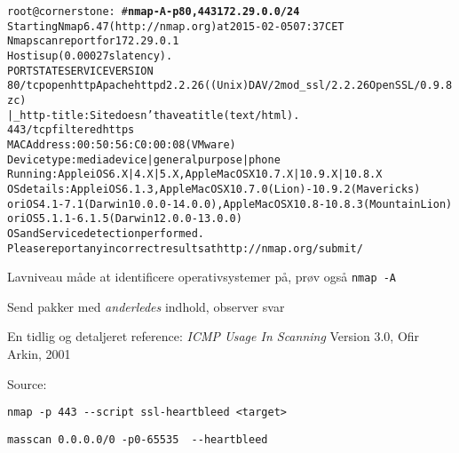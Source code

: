 \documentclass[Screen16to9,17pt]{foils}
\begin{document}
\begin{alltt}\footnotesize
root@cornerstone:~#{\bfseries nmap -A -p80,443 172.29.0.0/24}
Starting Nmap 6.47 ( http://nmap.org ) at 2015-02-05 07:37 CET
Nmap scan report for 172.29.0.1
Host is up (0.00027s latency).
PORT    STATE    SERVICE VERSION
80/tcp  open     http    Apache httpd 2.2.26 ((Unix) DAV/2 mod_ssl/2.2.26 OpenSSL/0.9.8zc)
|_http-title: Site doesn't have a title (text/html).
443/tcp filtered https
MAC Address: 00:50:56:C0:00:08 (VMware)
Device type: media device|general purpose|phone
Running: Apple iOS 6.X|4.X|5.X, Apple Mac OS X 10.7.X|10.9.X|10.8.X
OS details: Apple iOS 6.1.3, Apple Mac OS X 10.7.0 (Lion) - 10.9.2 (Mavericks)
or iOS 4.1 - 7.1 (Darwin 10.0.0 - 14.0.0), Apple Mac OS X 10.8 - 10.8.3 (Mountain Lion)
or iOS 5.1.1 - 6.1.5 (Darwin 12.0.0 - 13.0.0)
OS and Service detection performed.
Please report any incorrect results at http://nmap.org/submit/
\end{alltt}

\begin{list2}
\item Lavniveau måde at identificere operativsystemer på, prøv også
  \verb+nmap -A+
\item Send pakker med \emph{anderledes} indhold, observer svar
\item En tidlig og detaljeret reference: \emph{ICMP Usage In Scanning} Version 3.0,
  Ofir Arkin, 2001 %
\end{list2}




Source: 





\begin{list1}
\item \verb+nmap -p 443 --script ssl-heartbleed <target>+\\
\item \verb+masscan 0.0.0.0/0 -p0-65535  --heartbleed+\\
\end{list1}
\end{document}
